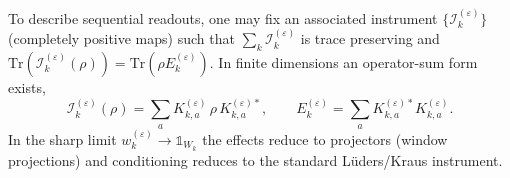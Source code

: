 \begin{axiom}
\begin{equation}
\end{equation}
To describe sequential readouts, one may fix an associated instrument $\{\mathcal{I}_k^{(\varepsilon)}\}$ (completely positive maps) such that $\sum_k \mathcal{I}_k^{(\varepsilon)}$ is trace preserving and $\mathrm{Tr}(\mathcal{I}_k^{(\varepsilon)}(\rho))=\mathrm{Tr}(\rho E_k^{(\varepsilon)})$. In finite dimensions an operator-sum form exists,
\begin{equation}
    \mathcal{I}_k^{(\varepsilon)}(\rho)=\sum_a K_{k,a}^{(\varepsilon)}\,\rho\,K_{k,a}^{(\varepsilon)*},\qquad
    E_k^{(\varepsilon)}=\sum_a K_{k,a}^{(\varepsilon)*}K_{k,a}^{(\varepsilon)}.
\end{equation}
In the sharp limit $w_k^{(\varepsilon)}\to \mathds{1}_{W_k}$ the effects reduce to projectors (window projections) and conditioning reduces to the standard L\"uders/Kraus instrument.
\end{axiom}

